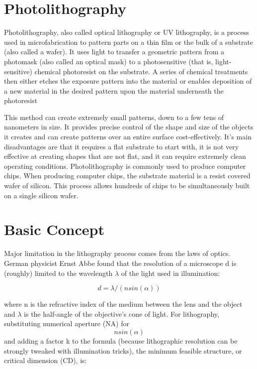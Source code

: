 \documentclass[12pt,a4paper]{report}
\begin{document}
\section{Photolithography}
Photolithography, also called optical lithography or UV lithography, 
is a process used in 
microfabrication to pattern parts on a thin film or the bulk of 
a substrate (also called a wafer). 
It uses light to transfer a geometric pattern from a photomask 
(also called an optical mask) to 
a photosensitive (that is, light-sensitive) chemical photoresist 
on the substrate. A series of 
chemical treatments then either etches the exposure pattern into 
the material or enables deposition 
of a new material in the desired pattern upon the material 
underneath the photoresist

This method can create extremely small patterns, down to a few 
tens of nanometers in size. 
It provides precise control of the shape and size of the objects 
it creates and can create 
patterns over an entire surface cost-effectively. It's main 
disadvantages are that it requires 
a flat substrate to start with, it is not very effective at 
creating shapes that are not flat, 
and it can require extremely clean operating conditions. 
Photolithography is commonly used to produce computer chips. 
When producing computer chips, 
the substrate material is a resist covered wafer of silicon. 
This process allows hundreds of 
chips to be simultaneously built on a single silicon wafer.





\section{Basic Concept}
Major limitation in the lithography process comes from 
the laws of optics. 
German physicist Ernst Abbe found that the resolution 
of a microscope d is 
(roughly) limited to the 
wavelength $\lambda$ of the light used in illumination:

$$d =\lambda/(nsin(\alpha))$$


where n is the refractive index of the medium between the 
lens and the object and 
$\lambda$ is the half-angle of the objective's cone of 
light. For lithography, substituting
numerical aperture (NA) for $$nsin(\alpha)$$ and adding 
a factor k to the formula 
(because lithographic resolution can be strongly tweaked 
with illumination tricks),
the minimum feasible structure, or critical dimension 
(CD), is:
\end{document}
